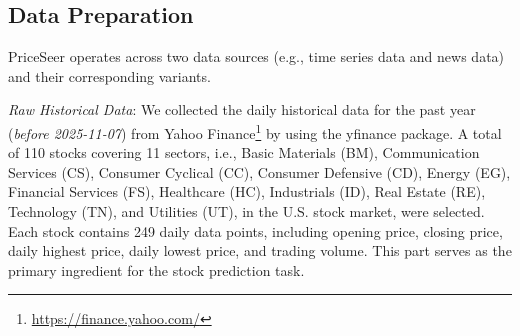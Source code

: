 \documentclass[conference]{IEEEtran}
\begin{document}
\subsection{Data Preparation}
PriceSeer operates across two data sources (e.g., time series data and news data) and their corresponding variants. 

\textit{Raw Historical Data}:
We collected the daily historical data for the past year ({\it before 2025-11-07}) from Yahoo Finance\footnote{\url{https://finance.yahoo.com/}} by using the yfinance package.
A total of 110 stocks covering 11 sectors, i.e., Basic Materials (BM), Communication Services (CS), Consumer Cyclical (CC), Consumer Defensive (CD), Energy (EG), Financial Services (FS), Healthcare (HC), Industrials (ID), Real Estate (RE), Technology (TN), and Utilities (UT), in the U.S. stock market, were selected.
Each stock contains 249 daily data points, including opening price, closing price, daily highest price, daily lowest price, and trading volume.
This part serves as the primary ingredient for the stock prediction task.
\end{document}
